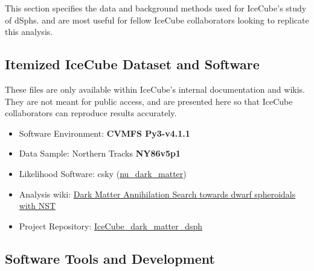 This section specifies the data and background methods used for IceCube's study of dSphs.
 and  are most useful for fellow IceCube collaborators looking to replicate this analysis.

\subsection{Itemized IceCube Dataset and Software}\label{sec:icDM_data}

These files are only available within IceCube's internal documentation and wikis.
They are not meant for public access, and are presented here so that IceCube collaborators can reproduce results accurately.

\begin{itemize}
    \item Software Environment: \textbf{CVMFS Py3-v4.1.1}
    \item Data Sample: Northern Tracks \textbf{NY86v5p1}
    \item Likelihood Software: csky (\href{https://github.com/icecube/csky/tree/nu\_dark\_matter}{nu\_dark\_matter})
    \item Analysis wiki: \href{https://wiki.icecube.wisc.edu/index.php/Dark\_Matter\_Annihilation\_Search\_towards\_dwarf\_spheroidals\_with\_NST\_and\_DNN\_Cascades}{Dark Matter Annihilation Search towards dwarf spheroidals with NST}
    \item Project Repository: \href{https://github.com/salaza82/IceCube_dark_matter_dsph}{IceCube\_dark\_matter\_dsph}
\end{itemize}

\subsection{Software Tools and Development}\label{sec:icDM_tools}


